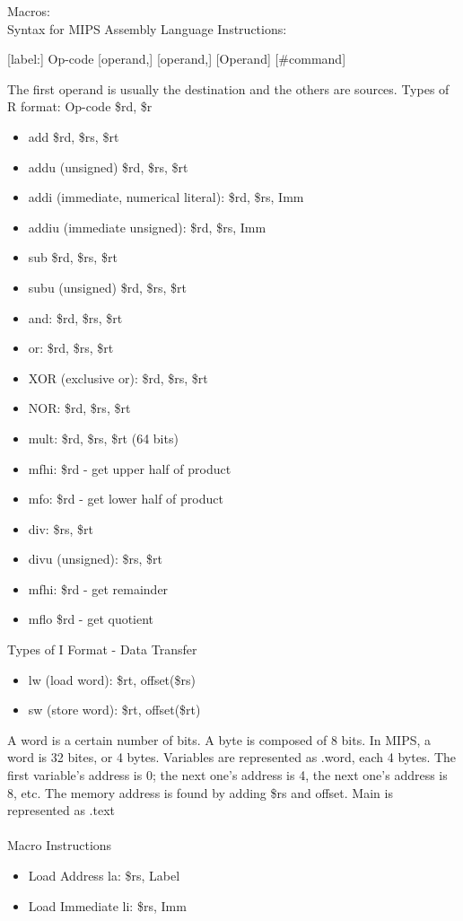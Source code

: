 \documentclass[12pt]{article}
\begin{document}
Macros: \\ 
Syntax for MIPS Assembly Language Instructions: 
\begin{center} [label:] Op-code [operand,] [operand,] [Operand] [\#command]  \end{center}
The first operand is usually the destination and the others are sources. \newpage
Types of R format: Op-code \$rd, \$r \begin{itemize}
\item add \$rd, \$rs, \$rt 
\item addu (unsigned) \$rd, \$rs, \$rt
\item addi (immediate, numerical literal): \$rd, \$rs, Imm
\item addiu (immediate unsigned): \$rd, \$rs, Imm 
\item sub \$rd, \$rs, \$rt 
\item subu (unsigned) \$rd, \$rs, \$rt
\item and: \$rd, \$rs, \$rt 
\item or: \$rd, \$rs, \$rt
\item XOR (exclusive or): \$rd, \$rs, \$rt
\item NOR:  \$rd, \$rs, \$rt
\item mult: \$rd, \$rs, \$rt (64 bits)
\item mfhi: \$rd - get upper half of product
\item mfo: \$rd - get lower half of product
\item div: \$rs, \$rt
\item divu (unsigned): \$rs, \$rt
\item mfhi: \$rd - get remainder
\item mflo \$rd - get quotient 
\end{itemize}

Types of I Format - Data Transfer \begin{itemize} 
\item lw (load word): \$rt, offset(\$rs)
\item sw (store word): \$rt, offset(\$rt)
\end{itemize} 

A word is a certain number of bits. A byte is composed of 8 bits. 
In MIPS, a word is 32 bites, or 4 bytes. 
Variables are represented as .word, each 4 bytes. 
The first variable's address is 0; the next one's address is 4, the next one's address is 8, etc. 
The memory address is found by adding \$rs and offset. 
Main is represented as .text \\~\\
Macro Instructions \begin{itemize} 
\item Load Address la: \$rs, Label
\item Load Immediate li: \$rs, Imm
\end{itemize}
\end{document}
